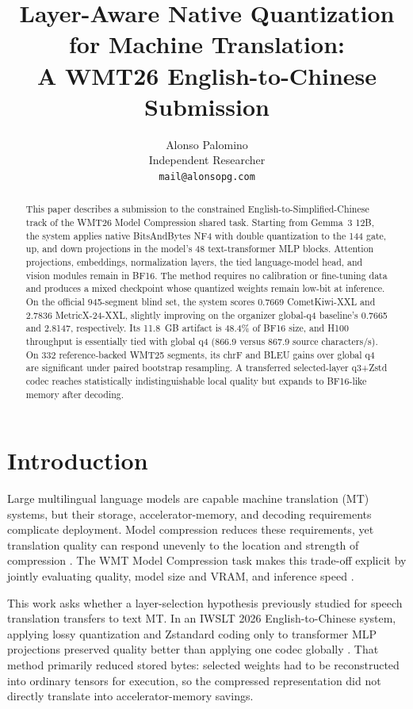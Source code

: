 \documentclass[11pt]{article}
\title{Layer-Aware Native Quantization for Machine Translation:\\
A WMT26 English-to-Chinese Submission}
\author{Alonso Palomino \\
  Independent Researcher \\
  \texttt{mail@alonsopg.com}}
\begin{document}
\maketitle

\begin{abstract}
This paper describes a submission to the constrained English-to-Simplified-Chinese track of the WMT26 Model Compression shared task. Starting from Gemma~3 12B, the system applies native BitsAndBytes NF4 with double quantization to the 144 gate, up, and down projections in the model's 48 text-transformer MLP blocks. Attention projections, embeddings, normalization layers, the tied language-model head, and vision modules remain in BF16. The method requires no calibration or fine-tuning data and produces a mixed checkpoint whose quantized weights remain low-bit at inference. On the official 945-segment blind set, the system scores 0.7669 CometKiwi-XXL and 2.7836 MetricX-24-XXL, slightly improving on the organizer global-q4 baseline's 0.7665 and 2.8147, respectively. Its 11.8~GB artifact is 48.4\% of BF16 size, and H100 throughput is essentially tied with global q4 (866.9 versus 867.9 source characters/s). On 332 reference-backed WMT25 segments, its chrF and BLEU gains over global q4 are significant under paired bootstrap resampling. A transferred selected-layer q3+Zstd codec reaches statistically indistinguishable local quality but expands to BF16-like memory after decoding.
\end{abstract}

\section{Introduction}

Large multilingual language models are capable machine translation (MT) systems, but their storage, accelerator-memory, and decoding requirements complicate deployment. Model compression reduces these requirements, yet translation quality can respond unevenly to the location and strength of compression \citep{mohammadshahi-etal-2022-compressed}. The WMT Model Compression task makes this trade-off explicit by jointly evaluating quality, model size and VRAM, and inference speed \citep{gaido-etal-2025-findings}.

This work asks whether a layer-selection hypothesis previously studied for speech translation transfers to text MT. In an IWSLT 2026 English-to-Chinese system, applying lossy quantization and Zstandard coding only to transformer MLP projections preserved quality better than applying one codec globally \citep{palomino-2026-selected}. That method primarily reduced stored bytes: selected weights had to be reconstructed into ordinary tensors for execution, so the compressed representation did not directly translate into accelerator-memory savings.
\end{document}
